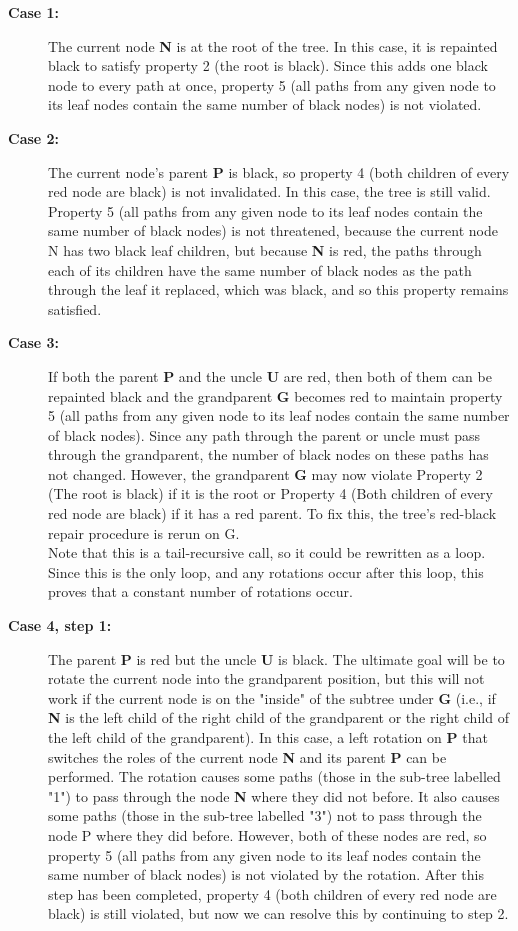 \documentclass{article}[10pt]
\begin{document}
\begin{description}
    \item[\textbf{Case 1:}]    
                The current node \textbf{N} is at the root of the tree. In this case, it is repainted black to satisfy property 2 (the root is black). Since this adds one black node to every path at once, property 5 (all paths from any given node to its leaf nodes contain the same number of black nodes) is not violated.
    \item[\textbf{Case 2:}]    
                The current node's parent \textbf{P} is black, so property 4 (both children of every red node are black) is not invalidated. In this case, the tree is still valid. Property 5 (all paths from any given node to its leaf nodes contain the same number of black nodes) is not threatened, because the current node N has two black leaf children, but because \textbf{N} is red, the paths through each of its children have the same number of black nodes as the path through the leaf it replaced, which was black, and so this property remains satisfied.   
    \item[\textbf{Case 3:}]    
                If both the parent \textbf{P} and the uncle \textbf{U} are red, then both of them can be repainted black and the grandparent \textbf{G} becomes red to maintain property 5 (all paths from any given node to its leaf nodes contain the same number of black nodes). Since any path through the parent or uncle must pass through the grandparent, the number of black nodes on these paths has not changed. However, the grandparent \textbf{G} may now violate Property 2 (The root is black) if it is the root or Property 4 (Both children of every red node are black) if it has a red parent. To fix this, the tree's red-black repair procedure is rerun on G.\\Note that this is a tail-recursive call, so it could be rewritten as a loop. Since this is the only loop, and any rotations occur after this loop, this proves that a constant number of rotations occur.
    \item[\textbf{Case 4, step 1:}]    
                The parent \textbf{P} is red but the uncle \textbf{U} is black. The ultimate goal will be to rotate the current node into the grandparent position, but this will not work if the current node is on the "inside" of the subtree under \textbf{G} (i.e., if \textbf{N} is the left child of the right child of the grandparent or the right child of the left child of the grandparent). In this case, a left rotation on \textbf{P} that switches the roles of the current node \textbf{N} and its parent \textbf{P} can be performed. The rotation causes some paths (those in the sub-tree labelled "1") to pass through the node \textbf{N} where they did not before. It also causes some paths (those in the sub-tree labelled "3") not to pass through the node P where they did before. However, both of these nodes are red, so property 5 (all paths from any given node to its leaf nodes contain the same number of black nodes) is not violated by the rotation. After this step has been completed, property 4 (both children of every red node are black) is still violated, but now we can resolve this by continuing to step 2.

\end{description}
\end{document}
